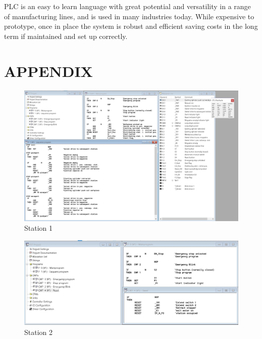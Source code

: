 \documentclass[a4paper, 10pt,  conference]{article}
\begin{document}
PLC is an easy to learn language with great potential and versatility in a range of manufacturing lines, and is used in many industries today. While expensive to prototype, once in place the system is robust and efficient saving costs in the long term if maintained and set up correctly.



\clearpage
\nocite{*}
\nocite{key}




\clearpage
\section*{APPENDIX}

\begin{figure}[h!]
  \includegraphics[width=\linewidth]{images/1}
  \caption{Station 1}
  \label{fig:Station 1}
\end{figure}

\begin{figure}[h!]
  \includegraphics[width=\linewidth]{images/2}
  \caption{Station 2}
  \label{fig:Station 2}
\end{figure}
\end{document}
